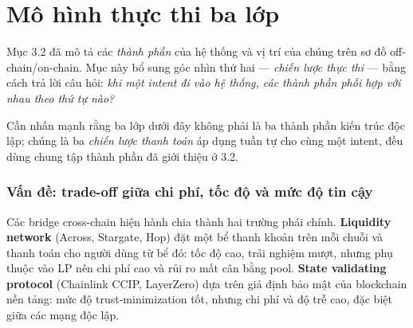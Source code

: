 %
%

\section{Mô hình thực thi ba lớp}
\label{sec:three-layer-model}

Mục 3.2 đã mô tả các \emph{thành phần} của hệ thống và vị trí của chúng
trên sơ đồ off-chain/on-chain. Mục này bổ sung góc nhìn thứ hai —
\emph{chiến lược thực thi} — bằng cách trả lời câu hỏi: \emph{khi một
intent đi vào hệ thống, các thành phần phối hợp với nhau theo thứ tự
nào?}

Cần nhấn mạnh rằng ba lớp dưới đây không phải là ba thành phần kiến
trúc độc lập; chúng là ba \emph{chiến lược thanh toán} áp dụng tuần
tự cho cùng một intent, đều dùng chung tập thành phần đã giới thiệu
ở 3.2.

\subsubsection*{Vấn đề: trade-off giữa chi phí, tốc độ và mức độ
tin cậy}

Các bridge cross-chain hiện hành chia thành hai trường phái chính.
\textbf{Liquidity network} (Across, Stargate, Hop) đặt một bể thanh
khoản trên mỗi chuỗi và thanh toán cho người dùng từ bể đó: tốc độ
cao, trải nghiệm mượt, nhưng phụ thuộc vào LP nên chi phí cao và rủi
ro mất cân bằng pool. \textbf{State validating protocol} (Chainlink
CCIP, LayerZero) dựa trên giả định bảo mật của blockchain nền tảng:
mức độ trust-minimization tốt, nhưng chi phí và độ trễ cao, đặc biệt
giữa các mạng độc lập.

